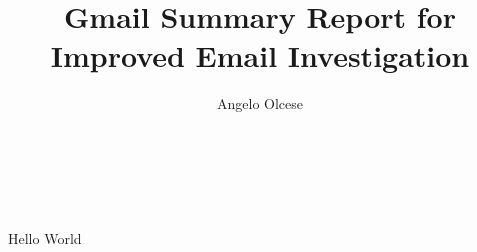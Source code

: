 \documentclass[5p]{elsarticle}
\begin{document}
\title{Gmail Summary Report for Improved Email Investigation}


\author{
\alignauthor
Angelo Olcese\\
\\
\\
\\
}

\maketitle
Hello World
\end{document}

